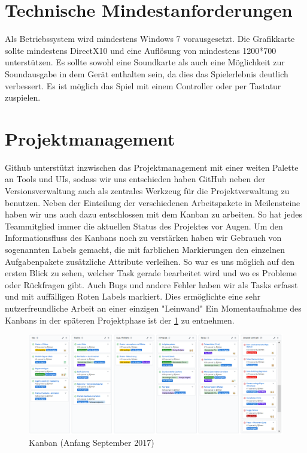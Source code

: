 \documentclass{article}
\begin{document}
\newpage
\section{Technische Mindestanforderungen}


Als Betriebssystem wird mindestens Windows 7 vorausgesetzt. Die Grafikkarte sollte mindestens DirectX10 und eine Auflösung von mindestens 1200*700 unterstützen. Es sollte sowohl eine
Soundkarte als auch eine Möglichkeit zur Soundausgabe in dem Gerät enthalten sein, da dies das Spielerlebnis deutlich verbessert.
Es ist möglich das Spiel mit einem Controller oder per Tastatur zuspielen.\newline

\vspace{1cm}
\section{Projektmanagement}


Github unterstützt inzwischen das Projektmanagement mit einer weiten Palette an Tools und UIs, sodass wir uns entschieden haben GitHub neben der Versionsverwaltung auch als zentrales Werkzeug für die Projektverwaltung zu benutzen.
Neben der Einteilung der verschiedenen Arbeitspakete in Meilensteine haben wir uns auch dazu entschlossen mit dem Kanban zu arbeiten. So hat jedes Teammitglied immer die aktuellen Status des Projektes vor Augen. Um den Informationsfluss des Kanbans noch zu verstärken haben wir Gebrauch von sogenannten Labels gemacht, die mit farblichen Markierungen den einzelnen Aufgabenpakete zusätzliche Attribute verleihen. So war es uns möglich auf den ersten Blick zu sehen, welcher Task gerade bearbeitet wird und wo es Probleme oder Rückfragen gibt. Auch Bugs und andere Fehler haben wir als Tasks erfasst und mit auffälligen Roten Labels markiert. Dies ermöglichte eine sehr nutzerfreundliche Arbeit an einer einzigen "Leinwand" 
Ein Momentaufnahme des Kanbans in der späteren Projektphase ist der \ref{fig:kanban} zu entnehmen.

\begin{figure}
	\centering
	\includegraphics[width=1\textwidth]{kanban.png}
	\caption{Kanban (Anfang September 2017)
		\label{fig:kanban}}
\end{figure}
\end{document}
